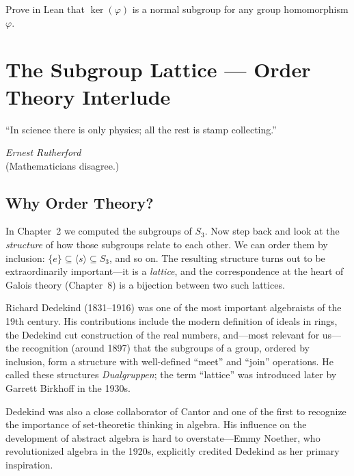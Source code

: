 \documentclass[11pt, a4paper, oneside]{book}
\renewcommand{\ker}{\operatorname{ker}}
\newcounter{exercise}[chapter]
\begin{document}
\begin{exercisebox}[title={Exercise 2.2}]
Prove in Lean that $\ker(\varphi)$ is a normal subgroup for any group
homomorphism $\varphi$.
\end{exercisebox}

\chapter{The Subgroup Lattice --- Order Theory Interlude}

\epigraph{``In science there is only physics; all the rest is stamp
collecting.''}{\textit{Ernest Rutherford}\\[2pt]
\small (Mathematicians disagree.)}

\section{Why Order Theory?}

In Chapter~2 we computed the subgroups of $S_3$. Now step back and look at the
\emph{structure} of how those subgroups relate to each other. We can order them
by inclusion: $\{e\} \subseteq \langle s \rangle \subseteq S_3$, and so on.
The resulting structure turns out to be extraordinarily important---it is a
\emph{lattice}, and the correspondence at the heart of Galois theory
(Chapter~8) is a bijection between two such lattices.

\begin{historical}[title={Dedekind and the Birth of Lattice Theory}]
Richard Dedekind (1831--1916) was one of the most important algebraists of the
19th century. His contributions include the modern definition of ideals in
rings, the Dedekind cut construction of the real numbers, and---most relevant
for us---the recognition (around 1897) that the subgroups of a group, ordered
by inclusion, form a structure with well-defined ``meet'' and ``join''
operations. He called these structures \textit{Dualgruppen}; the term
``lattice'' was introduced later by Garrett Birkhoff in the 1930s.

Dedekind was also a close collaborator of Cantor and one of the first to
recognize the importance of set-theoretic thinking in algebra. His influence
on the development of abstract algebra is hard to overstate---Emmy Noether,
who revolutionized algebra in the 1920s, explicitly credited Dedekind as her
primary inspiration.
\end{historical}
\end{document}

